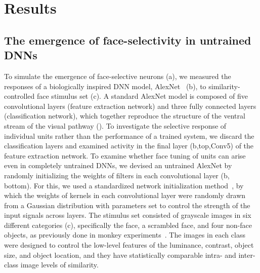 \documentclass[sn-mathphys]{sn-jnl}%
\theoremstyle{thmstyleone}%
\theoremstyle{thmstyletwo}%
\theoremstyle{thmstylethree}%
\begin{document}
\section{Results}\label{sec2}

\subsection{The emergence of face-selectivity in untrained DNNs}\par
To simulate the emergence of face-selective neurons (a), we measured the responses of a biologically inspired DNN model, AlexNet~\cite{krizhevsky2012imagenet} (b), to similarity-controlled face stimulus set (c).
A standard AlexNet model is composed of five convolutional layers (feature extraction network) and three fully connected layers (classification network), which together reproduce the structure of the ventral stream of the visual pathway ().
To investigate the selective response of individual units rather than the performance of a trained system, 
we discard the classification layers and examined activity in the final layer (b,top,Conv5) of the feature extraction network.
To examine whether face tuning of units can arise even in completely untrained DNNs, 
we devised an untrained AlexNet by randomly initializing the weights of filters in each convolutional layer (b, bottom).
For this, we used a standardized network initialization method~\cite{lecun2012efficient}, by which the weights of kernels in each convolutional layer were randomly drawn from a Gaussian distribution with parameters set to control the strength of the input signals across layers.
The stimulus set consisted of grayscale images in six different categories (c), specifically the face, a scrambled face, and four non-face objects, as previously done in monkey experiments~\cite{stigliani2015temporal}.
The images in each class were designed to control the low-level features of the luminance, contrast, object size, and object location, and they have statistically comparable intra- and inter-class image levels of similarity.
\end{document}
